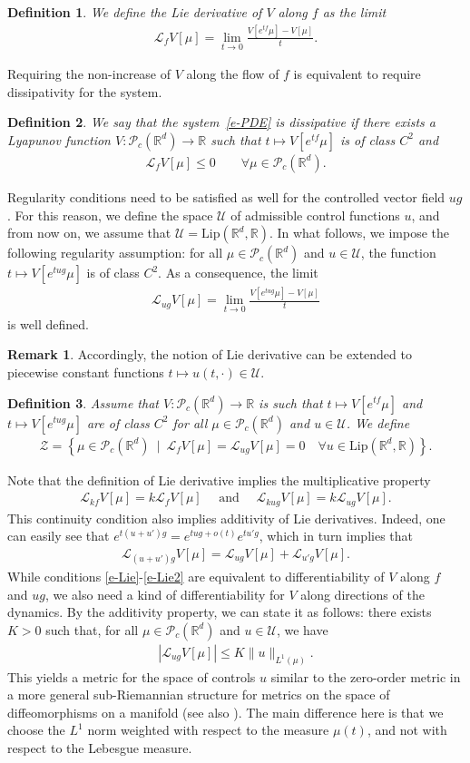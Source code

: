 \documentclass{article}
\newcommand{\R}{\mathbb{R}}
\renewcommand{\P}{\mathcal{P}_c(\R^d)}
\renewcommand{\L}{\mathcal{L}}
\newtheorem{definition}{Definition}[section]
\theoremstyle{definition}\newtheorem{remark}{Remark}
\newcommand{\Pg}[1]{\left\{ #1 \right\}}
\newcommand{\Pabs}[1]{\left| #1 \right|}
\newcommand{\bqn}{\begin{eqnarray}}
\newcommand{\eqnn}{\nonumber\end{eqnarray}}
\newcommand{\eqnl}[1]{\label{#1}\end{eqnarray}}
\newcommand{\Lip}{\mathrm{Lip}}
\renewcommand{\r}[1]{\eqref{#1}}
\newcommand{\U}{\mathcal{U}}
\begin{document}
\begin{definition}
We define the \emph{Lie derivative} of $V$ along $f$ as the limit
\bqn
\L_{f} V[\mu]=\lim_{t\to 0}\frac{V[e^{t f}\mu]-V[\mu]}{t}.
\eqnl{e-Lie}
\end{definition}

Requiring the non-increase of $V$ along the flow of $f$ is equivalent to require dissipativity for the system.

\begin{definition}
We say that the system~\eqref{e-PDE} is dissipative if there exists a Lyapunov function $V:\P \to \R$ such that  $t\mapsto V[e^{tf}\mu]$ is of class $C^2$  and
\bqn
\L_{f}V[\mu]\leq 0\qquad\forall\mu\in\P.
\eqnl{e-dissipative}
\end{definition}

Regularity conditions need to be satisfied as well for the controlled vector field $u g$. For this reason, we define the space $\U$ of admissible control functions $u$, and from now on, we  assume that $\U=\Lip(\R^d,\R)$. In what follows, we impose the following regularity assumption: for all $\mu\in\P$ and $u\in \U $, the function $t\mapsto V[e^{tug}\mu]$ is of class $C^2$. As a consequence, the limit
\bqn
\L_{ug} V[\mu]=\lim_{t\to 0}\frac{V[e^{t ug}\mu]-V[\mu]}{t}
\eqnl{e-Lie2}
is well defined.

\begin{remark}
Accordingly, the notion of Lie derivative can be extended to piecewise constant functions 
$t \mapsto u(t,\cdot) \in \U$.
\end{remark}

\begin{definition}
Assume that $V:\P \to \R$ is such that  $t\mapsto V[e^{tf}\mu]$ and $t\mapsto V[e^{tug}\mu]$ are of class $C^2$ for all $\mu\in\P$ and $u\in \U$. We define
\bqn
\mathcal{Z}=\Pg{\mu\in\P\ \mid\ \L_fV[\mu]=\L_{ug}V[\mu]=0\quad\forall u\in\Lip(\R^d,\R)}.
\eqnl{e-Z}
\end{definition}

Note that the definition of Lie derivative implies the multiplicative property
\bqn
\L_{k f} V[\mu]=k\L_{f}V[\mu]\mbox{~~~~and~~~~}\L_{k ug} V[\mu]=k\L_{ug}V[\mu].
\eqnl{e-mult}
This continuity condition also implies additivity of Lie derivatives. Indeed, one can easily see that $e^{t(u+u')g}=e^{tug+o(t)}e^{tu'g}$, which in turn implies that
\bqn
\L_{(u+u')g} V[\mu]=\L_{ug}V[\mu]+\L_{u'g}V[\mu].
\eqnn
While conditions \r{e-Lie}-\r{e-Lie2} are equivalent to differentiability of $V$ along $f$ and $ug$, we also need a kind of differentiability for $V$ along directions of the dynamics. By the additivity property, we can state it as follows: there exists $K>0$ such that, for all $\mu\in\P$ and $u\in \U$, we have
\bqn
\Pabs{\L_{ug}V[\mu]}\leq K \|u\|_{L^1(\mu)}.
\eqnl{e-diff}
This yields a metric for the space of controls $u$ similar to the zero-order metric in a more general sub-Riemannian structure for metrics on the space of diffeomorphisms on a manifold \cite{arg-tre} (see also \cite{agra-capo}). The main difference here is that we choose the $L^1$ norm weighted with respect to the measure $\mu(t)$, and not with respect to the Lebesgue measure. 
\end{document}
